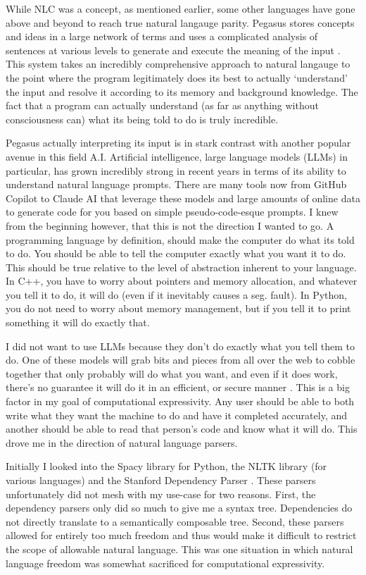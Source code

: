 \documentclass[titlepage]{article}
\begin{document}
While NLC was a concept, as mentioned earlier, some other languages have gone above and beyond to reach true natural langauge parity. Pegasus stores concepts and ideas in a large network of terms and uses a complicated analysis of sentences at various levels to generate and execute the meaning of the input \cite{Knöll2006PegasusFS}. This system takes an incredibly comprehensive approach to natural langauge to the point where the program legitimately does its best to actually `understand' the input and resolve it according to its memory and background knowledge. The fact that a program can actually understand (as far as anything without consciousness can) what its being told to do is truly incredible.

Pegasus actually interpreting its input is in stark contrast with another popular avenue in this field A.I. Artificial intelligence, large language models (LLMs) in particular, has grown incredibly strong in recent years in terms of its ability to understand natural language prompts. There are many tools now from GitHub Copilot to Claude AI that leverage these models and large amounts of online data to generate code for you based on simple pseudo-code-esque prompts. I knew from the beginning however, that this is not the direction I wanted to go. A programming language by definition, should make the computer do what its told to do. You should be able to tell the computer exactly what you want it to do. This should be true relative to the level of abstraction inherent to your language. In C++, you have to worry about pointers and memory allocation, and whatever you tell it to do, it will do (even if it inevitably causes a seg. fault). In Python, you do not need to worry about memory management, but if you tell it to print something it will do exactly that.

I did not want to use LLMs because they don't do exactly what you tell them to do. One of these models will grab bits and pieces from all over the web to cobble together that only probably will do what you want, and even if it does work, there's no guarantee it will do it in an efficient, or secure manner \cite{Fu2023SecurityWO}. This is a big factor in my goal of computational expressivity. Any user should be able to both write what they want the machine to do and have it completed accurately, and another should be able to read that person's code and know what it will do. This drove me in the direction of natural language parsers.

Initially I looked into the Spacy library for Python, the NLTK library (for various languages) and the Stanford Dependency Parser \cite{Marneffe2006GeneratingTD}. These parsers unfortunately did not mesh with my use-case for two reasons. First, the dependency parsers only did so much to give me a syntax tree. Dependencies do not directly translate to a semantically composable tree. Second, these parsers allowed for entirely too much freedom and thus would make it difficult to restrict the scope of allowable natural language. This was one situation in which natural language freedom was somewhat sacrificed for computational expressivity.
\end{document}
